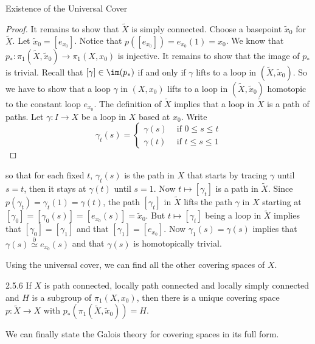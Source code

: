 \documentclass[a4paper]{article}
\begin{document}
\begin{thm}{Existence of the Universal Cover}{}
\begin{proof}
It remains to show that $\tilde{X}$ is simply connected. Choose a basepoint $\tilde{x}_0$ for $\tilde{X}$. Let $\tilde{x}_0=[e_{x_0}]$. Notice that $p\left([e_{x_0}]\right)=e_{x_0}(1)=x_0$. We know that $p_\ast:\pi_1(\tilde{X},\tilde{x}_0)\to\pi_1(X,x_0)$ is injective. It remains to show that the image of $p_\ast$ is trivial. Recall that $[\gamma]\in\im(p_\ast)$ if and only if $\gamma$ lifts to a loop in $(\tilde{X},\tilde{x}_0)$. So we have to show that a loop $\gamma$ in $(X,x_0)$ lifts to a loop in $(\tilde{X},\tilde{x}_0)$ homotopic to the constant loop $e_{x_0}$. The definition of $\tilde{X}$ implies that a loop in $\tilde{X}$ is a path of paths. Let $\gamma:I\to X$ be a loop in $X$ based at $x_0$. Write $$\gamma_t(s)=\begin{cases}
\gamma(s) & \text{ if }0\leq s\leq t\\
\gamma(t) & \text{ if }t\leq s\leq 1
\end{cases}$$
\end{proof}
so that for each fixed $t$, $\gamma_t(s)$ is the path in $X$ that starts by tracing $\gamma$ until $s=t$, then it stays at $\gamma(t)$ until $s=1$. Now $t\mapsto[\gamma_t]$ is a path in $\tilde{X}$. Since $p(\gamma_t)=\gamma_t(1)=\gamma(t)$, the path $[\gamma_t]$ in $\tilde{X}$ lifts the path $\gamma$ in $X$ starting at $[\gamma_0]=[\gamma_0(s)]=[e_{x_0}(s)]=\tilde{x}_0$. But $t\mapsto[\gamma_t]$ being a loop  in $\tilde{X}$ implies that $[\gamma_0]=[\gamma_1]$ and that $[\gamma_1]=[e_{x_0}]$. Now $\gamma_1(s)=\gamma(s)$ implies that $\gamma(s)\overset{\partial}{\simeq}e_{x_0}(s)$ and that $\gamma(s)$ is homotopically trivial. 
\end{thm}

Using the universal cover, we can find all the other covering spaces of $X$. 

\begin{thm}{}{2.5.6} If $X$ is path connected, locally path connected and locally simply connected and $H$ is a subgroup of $\pi_1(X,x_0)$, then there is a unique covering space $p:\tilde{X}\to X$ with $p_\ast(\pi_1(\tilde{X},\tilde{x}_0))=H$. 
\end{thm}

We can finally state the Galois theory for covering spaces in its full form. 
\end{document}
